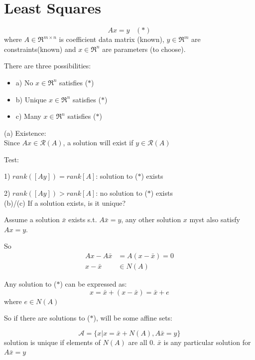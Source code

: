 
\section{Least Squares}

\begin{equation*}
Ax = y \,\,\,\,\,(*)
\end{equation*}
where $A\in \Re^{m\times n}$ is coefficient data matrix (known), $y\in \Re^m$ are constraints(known) and $x\in \Re^n$ are parameters (to choose).

There are three possibilities:

\begin{itemize}
	\item a) No $x\in \Re^n$ satisfies ($*$)
	
	\item b) Unique $x\in \Re^n$ satisfies ($*$)
	
	\item c) Many $x\in \Re^n$ satisfies ($*$)
\end{itemize}

(a) Existence:\\

Since $Ax\in \mathcal{R}(A)$, a solution will exist if $y\in \mathcal{R}(A)$

Test: 

1) $rank([A y]) = rank[A]$: solution to ($*$) exists

2) $rank([A y]) > rank[A]$: no solution to ($*$) exists\\

(b)/(c) If a solution exists, is it unique?

Assume a solution $\bar{x}$ exists s.t. $A\bar{x} = y$, any other solution $x$ myst also satisfy $Ax = y$. 

So 
\begin{align*}
Ax - A\bar{x} &= A(x -\bar{x}) = 0\\
x - \bar{x} &\in N(A)
\end{align*}

Any solution to ($*$) can be expressed as:
\begin{equation*}
x = \bar{x} + (x - \bar{x}) = \bar{x} + e
\end{equation*}
where $e\in N(A)$

So if there are solutions to ($*$), will be some affine sets:

\begin{equation*}
\mathcal{A} = \{x|x = \bar{x} + N(A), A\bar{x} = y \}
\end{equation*}
solution is unique if elements of $N(A)$ are all 0. $\bar{x}$ is any particular solution for $A\bar{x} =y$

